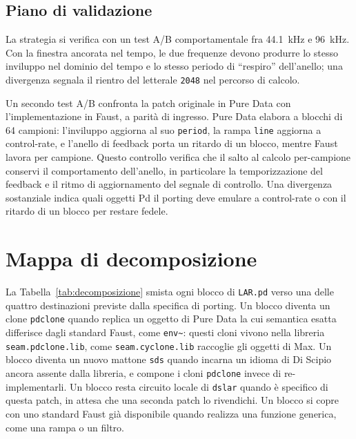 \documentclass[11pt,a4paper]{article}
\begin{document}
\subsection{Piano di validazione}
La strategia si verifica con un test A/B comportamentale fra \SI{44.1}{\kilo\hertz} e \SI{96}{\kilo\hertz}.
Con la finestra ancorata nel tempo, le due frequenze devono produrre lo stesso inviluppo nel dominio del tempo e lo stesso periodo di ``respiro'' dell'anello; una divergenza segnala il rientro del letterale \texttt{2048} nel percorso di calcolo.

Un secondo test A/B confronta la patch originale in Pure Data con l'implementazione in Faust, a parità di ingresso.
Pure Data elabora a blocchi di 64 campioni: l'inviluppo aggiorna al suo \texttt{period}, la rampa \texttt{line} aggiorna a control-rate, e l'anello di feedback porta un ritardo di un blocco, mentre Faust lavora per campione.
Questo controllo verifica che il salto al calcolo per-campione conservi il comportamento dell'anello, in particolare la temporizzazione del feedback e il ritmo di aggiornamento del segnale di controllo.
Una divergenza sostanziale indica quali oggetti Pd il porting deve emulare a control-rate o con il ritardo di un blocco per restare fedele.

\section{Mappa di decomposizione}\label{sec:decomposizione}
La Tabella~\ref{tab:decomposizione} smista ogni blocco di \texttt{LAR.pd} verso una delle quattro destinazioni previste dalla specifica di porting.
Un blocco diventa un clone \texttt{pdclone} quando replica un oggetto di Pure Data la cui semantica esatta differisce dagli standard Faust, come \texttt{env\textasciitilde{}}: questi cloni vivono nella libreria \texttt{seam.pdclone.lib}, come \texttt{seam.cyclone.lib} raccoglie gli oggetti di Max.
Un blocco diventa un nuovo mattone \texttt{sds} quando incarna un idioma di Di Scipio ancora assente dalla libreria, e compone i cloni \texttt{pdclone} invece di re-implementarli.
Un blocco resta circuito locale di \texttt{dslar} quando è specifico di questa patch, in attesa che una seconda patch lo rivendichi.
Un blocco si copre con uno standard Faust già disponibile quando realizza una funzione generica, come una rampa o un filtro.
\end{document}
